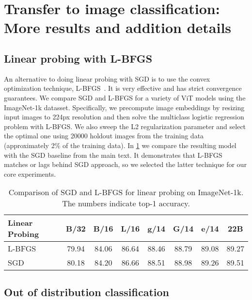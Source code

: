\documentclass{article}
\begin{document}
 \section{Transfer to image classification: More results and addition details}

\subsection{Linear probing with L-BFGS}\label{app:linear}
An alternative to doing linear probing with SGD is to use the convex optimization technique, L-BFGS~\citep{byrd1995limited}. It is very effective and has strict convergence guarantees. We compare SGD and L-BFGS for a variety of ViT models using the ImageNet-1k datasset. Specifically, we precompute image embeddings by resizing input images to 224px resolution and then solve the multiclass logistic regression problem with L-BFGS. We also sweep the L2 regularization parameter and select the optimal one using 20000 holdout images from the training data (approximately 2\% of the training data). In \cref{tab:app:bfgs} we compare the resulting model with the SGD baseline from the main text. It demonstrates that L-BFGS matches or lags behind SGD approach, so we selected the latter technique for our core experiments.

\begin{table}[h]
    \caption{Comparison of SGD and L-BFGS for linear probing on ImageNet-1k. The numbers indicate top-1 accuracy.}
\centering
\small
  \setlength{\tabcolsep}{4pt}
    \begin{tabular}{@{} l c c c c c c c @{}}
      \toprule
	    Linear Probing & B/32 & B/16 & L/16 & g/14 & G/14 & e/14 & 22B \\
      \midrule
      L-BFGS & 79.94 & 84.06 & 86.64 & 88.46 & 88.79 & 89.08 & 89.27 \\
      SGD & 80.18 & 84.20 & 86.66 & 88.51 & 88.98 & 89.26 & 89.51 \\
      \bottomrule
 \end{tabular}
    \label{tab:app:bfgs}
\end{table}


\label{app:image_classification}








\subsection{Out of distribution classification}
\label{app:ood}
\end{document}
